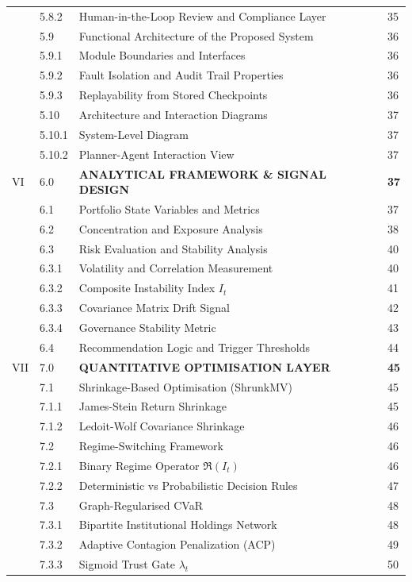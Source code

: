 \documentclass[11pt]{article}
\begin{document}
\begin{longtable}{C{0.8cm}C{1.2cm}L{9.7cm}C{1.2cm}}
 & 5.8.2 & Human-in-the-Loop Review and Compliance Layer & 35 \\
 & 5.9 & Functional Architecture of the Proposed System & 36 \\
 & 5.9.1 & Module Boundaries and Interfaces & 36 \\
 & 5.9.2 & Fault Isolation and Audit Trail Properties & 36 \\
 & 5.9.3 & Replayability from Stored Checkpoints & 36 \\
 & 5.10 & Architecture and Interaction Diagrams & 37 \\
 & 5.10.1 & System-Level Diagram & 37 \\
 & 5.10.2 & Planner-Agent Interaction View & 37 \\
VI & 6.0 & \textbf{ANALYTICAL FRAMEWORK \& SIGNAL DESIGN} & \textbf{37} \\
 & 6.1 & Portfolio State Variables and Metrics & 37 \\
 & 6.2 & Concentration and Exposure Analysis & 38 \\
 & 6.3 & Risk Evaluation and Stability Analysis & 40 \\
 & 6.3.1 & Volatility and Correlation Measurement & 40 \\
 & 6.3.2 & Composite Instability Index $I_t$ & 41 \\
 & 6.3.3 & Covariance Matrix Drift Signal & 42 \\
 & 6.3.4 & Governance Stability Metric & 43 \\
 & 6.4 & Recommendation Logic and Trigger Thresholds & 44 \\
VII & 7.0 & \textbf{QUANTITATIVE OPTIMISATION LAYER} & \textbf{45} \\
 & 7.1 & Shrinkage-Based Optimisation (ShrunkMV) & 45 \\
 & 7.1.1 & James-Stein Return Shrinkage & 45 \\
 & 7.1.2 & Ledoit-Wolf Covariance Shrinkage & 46 \\
 & 7.2 & Regime-Switching Framework & 46 \\
 & 7.2.1 & Binary Regime Operator $\Re(I_t)$ & 46 \\
 & 7.2.2 & Deterministic vs Probabilistic Decision Rules & 47 \\
 & 7.3 & Graph-Regularised CVaR & 48 \\
 & 7.3.1 & Bipartite Institutional Holdings Network & 48 \\
 & 7.3.2 & Adaptive Contagion Penalization (ACP) & 49 \\
 & 7.3.3 & Sigmoid Trust Gate $\lambda_t$ & 50 \\

\end{longtable}
\end{document}
